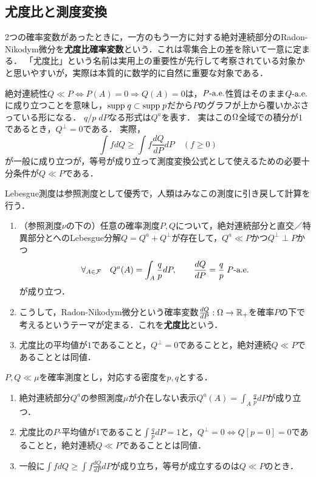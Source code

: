 \documentclass[uplatex,dvipdfmx]{jsreport}
\begin{document}
\subsection{尤度比と測度変換}

\begin{tcolorbox}[colframe=ForestGreen, colback=ForestGreen!10!white,breakable,colbacktitle=ForestGreen!40!white,coltitle=black,fonttitle=\bfseries\sffamily,
title=測度変換の公式が成り立つためには，絶対連続性が必要である．]
    2つの確率変数があったときに，一方のもう一方に対する絶対連続部分のRadon-Nikodym微分を\textbf{尤度比確率変数}という．これは零集合上の差を除いて一意に定まる．
    「尤度比」という名前は実用上の重要性が先行して考察されている対象かと思いやすいが，実際は本質的に数学的に自然に重要な対象である．

    絶対連続性$Q\ll P\Leftrightarrow P(A)=0\Rightarrow Q(A)=0$は，$P\text{-a.e.}$性質はそのまま$Q\text{-a.e.}$に成り立つことを意味し，$\mathrm{supp}\; q\subset\mathrm{supp}\; p$だから$P$のグラフが上から覆いかぶさっている形になる．
    $q/p\; dP$なる形式は$Q^a$を表す．
    実はこの$\Omega$全域での積分が$1$であるとき，$Q^\perp=0$である．
    実際，
    \[\int fdQ\ge\int f\frac{dQ}{dP}dP\quad(f\ge0)\]
    が一般に成り立つが，等号が成り立って測度変換公式として使えるための必要十分条件が$Q\ll P$である．

    Lebesgue測度は参照測度として優秀で，人類はみなこの測度に引き戻して計算を行う．
\end{tcolorbox}

\begin{motivation}\mbox{}
    \begin{enumerate}
        \item （参照測度$\nu$の下の）任意の確率測度$P,Q$について，絶対連続部分と直交／特異部分とへのLebesgue分解$Q=Q^a+Q^\perp$が存在して，$Q^a\ll P$かつ$Q^\perp\perp P$かつ
        \[\forall_{A\in\mathcal{F}}\quad Q^a(A)=\int_A\frac{q}{p}dP,\qquad \frac{dQ}{dP}=\frac{q}{p}\;P\text{-a.e.}\]
        が成り立つ．
        \item こうして，Radon-Nikodym微分という確率変数$\frac{dQ}{dP}:\Omega\to\mathbb{R}_+$を確率$P$の下で考えるというテーマが定まる．これを\textbf{尤度比}という．
        \item 尤度比の平均値が$1$であることと，$Q^\perp=0$であることと，絶対連続$Q\ll P$であることとは同値．
    \end{enumerate}
\end{motivation}

\begin{lemma}
    $P,Q\ll\mu$を確率測度とし，対応する密度を$p,q$とする．
    \begin{enumerate}
        \item 絶対連続部分$Q^a$の参照測度$\mu$が介在しない表示$Q^a(A)=\int_A\frac{q}{p}dP$が成り立つ．
        \item 尤度比の$P$-平均値が$1$であること$\int\frac{q}{p}dP=1$と，$Q^\perp=0\Leftrightarrow Q[p=0]=0$であることと，絶対連続$Q\ll P$であることとは同値．
        \item 一般に$\int fdQ\ge\int f\frac{dQ}{dP}dP$が成り立ち，等号が成立するのは$Q\ll P$のとき．
    \end{enumerate}
\end{lemma}
\end{document}
